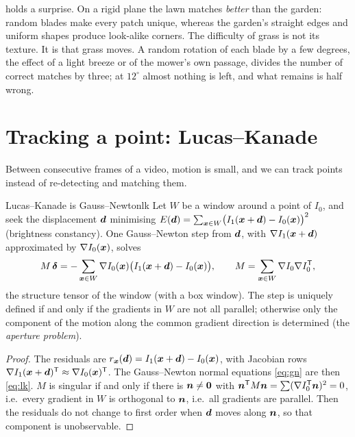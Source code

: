  holds a surprise. On a rigid plane the lawn matches
\emph{better} than the garden: random blades make every patch unique,
whereas the garden's straight edges and uniform shapes produce
look-alike corners. The difficulty of grass is not its texture. It is
that grass moves. A random rotation of each blade by a few degrees, the
effect of a light breeze or of the mower's own passage, divides the
number of correct matches by three; at $12^\circ$ almost nothing is
left, and what remains is half wrong.

\section{Tracking a point: Lucas--Kanade}

Between consecutive frames of a video, motion is small, and we can track
points instead of re-detecting and matching them.

\begin{proposition}{Lucas--Kanade is Gauss--Newton}{lk}
Let $W$ be a window around a point of $I_0$, and seek the displacement
$\bm{d}$ minimising $E(\bm{d})=\sum_{\bm{x}\in W}\bigl(I_1(
\bm{x}+\bm{d})-I_0(\bm{x})\bigr)^2$ (brightness constancy). One
Gauss--Newton step from $\bm{d}$, with $\nabla I_1(\bm{x}+\bm{d})$
approximated by $\nabla I_0(\bm{x})$, solves
\begin{equation}\label{eq:lk}
M\,\bm{\delta}=-\sum_{\bm{x}\in W}\nabla I_0(\bm{x})\bigl(I_1(
\bm{x}+\bm{d})-I_0(\bm{x})\bigr),\qquad
M=\sum_{\bm{x}\in W}\nabla I_0\nabla I_0^{\mathsf{T}},
\end{equation}
the structure tensor of the window (with a box window). The step is
uniquely defined if and only if the gradients in $W$ are not all
parallel; otherwise only the component of the motion along the common
gradient direction is determined (the \emph{aperture problem}).
\end{proposition}

\begin{proof}
The residuals are $r_{\bm{x}}(\bm{d})=I_1(\bm{x}+\bm{d})-I_0(
\bm{x})$, with Jacobian rows $\nabla I_1(\bm{x}+\bm{d})^{\mathsf{T}}\approx
\nabla I_0(\bm{x})^{\mathsf{T}}$. The Gauss--Newton normal equations
\eqref{eq:gn} are then \eqref{eq:lk}. $M$ is singular if and only if
there is $\bm{n}\neq\bm{0}$ with $\bm{n}^{\mathsf{T}} M\bm{n}=\sum(\nabla I_0
^{\mathsf{T}}\bm{n})^2=0$, i.e.\ every gradient in $W$ is orthogonal to
$\bm{n}$, i.e.\ all gradients are parallel. Then the residuals do not
change to first order when $\bm{d}$ moves along $\bm{n}$, so that
component is unobservable.
\end{proof}

